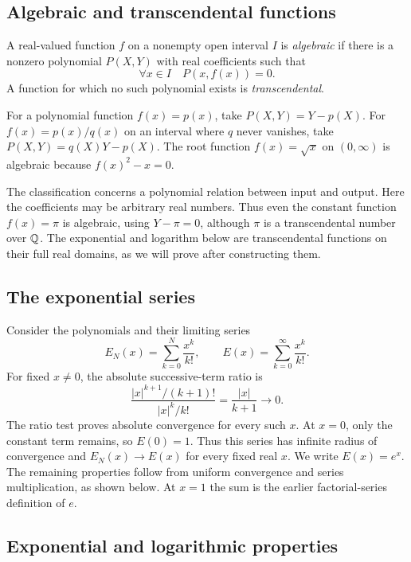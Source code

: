 \subsection{Algebraic and transcendental functions}
\begin{definition}
  \label{thm:analysis-i:algebraic-function}
  A real-valued function $f$ on a nonempty open interval $I$ is
  \emph{algebraic} if there is a nonzero polynomial $P(X,Y)$ with
  real coefficients such that
  \[
    \forall x\in I\quad P(x,f(x))=0.
  \]
  A function for which no such polynomial exists is
  \emph{transcendental}.
\end{definition}
For a polynomial function $f(x)=p(x)$, take $P(X,Y)=Y-p(X)$.
For $f(x)=p(x)/q(x)$ on an interval where $q$ never vanishes, take
$P(X,Y)=q(X)Y-p(X)$. The root function $f(x)=\sqrt{x}$ on $(0,\infty)$
is algebraic because $f(x)^2-x=0$.

The classification concerns a polynomial relation between input and
output. Here the coefficients may be arbitrary real numbers. Thus even
the constant function $f(x)=\pi$ is algebraic, using $Y-\pi=0$,
although $\pi$ is a transcendental number over $\mathbb{Q}$.
The exponential and logarithm below are transcendental functions on
their full real domains, as we will prove after constructing them.


\subsection{The exponential series}

Consider the polynomials and their limiting series
\[
  E_N(x)=\sum_{k=0}^{N}\frac{x^k}{k!},\qquad
  E(x)=\sum_{k=0}^{\infty}\frac{x^k}{k!}.
\]
For fixed $x\ne0$, the absolute successive-term ratio is
\[
  \frac{|x|^{k+1}/(k+1)!}{|x|^k/k!}
  =\frac{|x|}{k+1}\longrightarrow0.
\]
The ratio test proves absolute convergence for every such $x$.
At $x=0$, only the constant term remains, so $E(0)=1$.
Thus this series has infinite radius of convergence and $E_N(x)\to E(x)$
for every fixed real $x$. We write $E(x)=e^x$.
The remaining properties follow from uniform convergence and
series multiplication, as shown below. At $x=1$ the sum is the earlier
factorial-series definition of $e$.

\subsection{Exponential and logarithmic properties}

